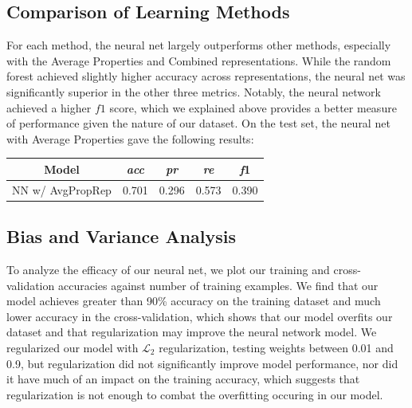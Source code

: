\documentclass[10pt,twocolumn,letterpaper]{article}
\begin{document}
\subsection{Comparison of Learning Methods}
For each method, the neural net largely outperforms other methods, especially with the Average Properties and Combined representations. While the random forest achieved slightly higher accuracy across representations, the neural net was significantly superior in the other three metrics. Notably, the neural network achieved a higher $f1$ score, which we explained above provides a better measure of performance given the nature of our dataset. On the test set, the neural net with Average Properties gave the following results:
\begin{center}
\begin{tabular}{|c|c|c|c|c|}
    \hline
    \textbf{Model} & \textbf{\textit{acc}} & \textbf{\textit{pr}} & \textbf{\textit{re}} & \textbf{\textit{f}1} \\
    \hline
    NN w/ AvgPropRep & 0.701 & 0.296 & 0.573 & 0.390 \\
    \hline
\end{tabular}    
\end{center}

\subsection{Bias and Variance Analysis}
To analyze the efficacy of our neural net, we plot our training and cross-validation accuracies against number of training examples. We find that our model achieves greater than 90\% accuracy on the training dataset and much lower accuracy in the cross-validation, which shows that our model overfits our dataset and that regularization may improve the neural network model. We regularized our model with $\mathcal{L}_2$ regularization, testing weights between 0.01 and 0.9, but regularization did not significantly improve model performance, nor did it have much of an impact on the training accuracy, which suggests that regularization is not enough to combat the overfitting occuring in our model.
\end{document}
